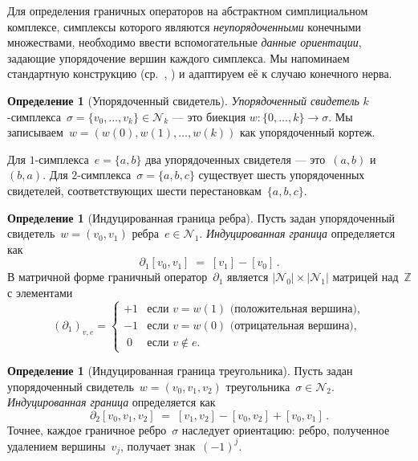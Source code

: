 \documentclass[11pt,a4paper]{article}
\theoremstyle{plain}
\theoremstyle{definition}
\newtheorem{definition}[theorem]{Определение}
\theoremstyle{remark}
\newcommand{\ZZ}{\mathbb{Z}}
\newcommand{\cN}{\mathcal{N}}
\begin{document}
Для определения граничных операторов на абстрактном симплициальном
комплексе, симплексы которого являются \emph{неупорядоченными} конечными
множествами, необходимо ввести вспомогательные \emph{данные ориентации},
задающие упорядочение вершин каждого симплекса. Мы напоминаем стандартную
конструкцию (ср.~\cite[глава~2]{Hatcher:2002},
\cite[глава~1]{Munkres:1984}) и адаптируем её к случаю конечного нерва.

\begin{definition}[Упорядоченный свидетель]
\label{def:witness}
\emph{Упорядоченный свидетель} $k$-симплекса~$\sigma = \{v_0, \ldots, v_k\}
\in \cN_k$ --- это биекция $w \colon \{0, \ldots, k\} \to \sigma$.
Мы записываем~$w = (w(0), w(1), \ldots, w(k))$ как упорядоченный кортеж.
\end{definition}

Для $1$-симплекса~$e = \{a,b\}$ два упорядоченных свидетеля ---
это~$(a,b)$ и~$(b,a)$. Для $2$-симплекса~$\sigma = \{a,b,c\}$ существует
шесть упорядоченных свидетелей, соответствующих шести перестановкам~$\{a,b,c\}$.

\begin{definition}[Индуцированная граница ребра]
\label{def:edge-boundary}
Пусть задан упорядоченный свидетель~$w = (v_0, v_1)$ ребра~$e \in \cN_1$.
\emph{Индуцированная граница} определяется как
\begin{equation}
  \label{eq:edge-boundary}
  \partial_1 [v_0, v_1] \;=\; [v_1] - [v_0]\,.
\end{equation}
В матричной форме граничный оператор~$\partial_1$ является
$|\cN_0| \times |\cN_1|$ матрицей над~$\ZZ$ с элементами
\[
  (\partial_1)_{v,e} =
  \begin{cases}
    +1 & \text{если } v = w(1) \text{ (положительная вершина)}, \\
    -1 & \text{если } v = w(0) \text{ (отрицательная вершина)}, \\
    \;0 & \text{если } v \notin e.
  \end{cases}
\]
\end{definition}

\begin{definition}[Индуцированная граница треугольника]
\label{def:triangle-boundary}
Пусть задан упорядоченный свидетель~$w = (v_0, v_1, v_2)$
треугольника~$\sigma \in \cN_2$. \emph{Индуцированная граница}
определяется как
\begin{equation}
  \label{eq:triangle-boundary}
  \partial_2 [v_0, v_1, v_2] \;=\; [v_1, v_2] - [v_0, v_2] + [v_0, v_1]\,.
\end{equation}
Точнее, каждое граничное ребро~$\sigma$ наследует ориентацию:
ребро, полученное удалением вершины~$v_j$, получает знак~$(-1)^j$.
\end{definition}
\end{document}
